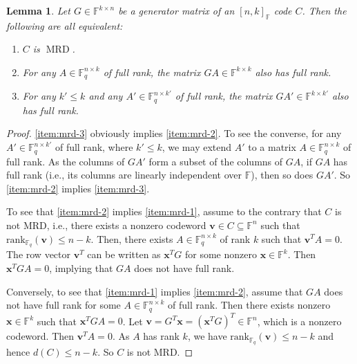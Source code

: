 \documentclass[11pt]{article}
\theoremstyle{plain}
\newtheorem{lemma}[thm]{Lemma}
\theoremstyle{definition}
\newtheorem{defn}[thm]{Definition}
\theoremstyle{remark}
\newcommand{\F}{\mathbb{F}}
\newcommand{\bv}{\bm{v}}
\newcommand{\bx}{\bm{x}}
\newcommand{\rank}{\mathrm{rank}}
\begin{document}

\begin{lemma}\label{eqmrd}
Let $G\in \F^{k\times n}$ be a generator matrix of an $[n,k]_{\F}$ code $C$. Then the following are all equivalent:
\begin{enumerate}
\item\label{item:mrd-1} $C$ is $\operatorname{MRD}$.
\item\label{item:mrd-2} For any  $A\in\F_q^{n\times k}$ of full rank, the matrix $GA\in \F^{k\times k}$ also has full rank.
\item\label{item:mrd-3} For any $k'\leq k$ and any $A'\in\F_q^{n\times k'}$ of full rank, the matrix $GA'\in \F^{k\times k'}$ also has full rank.
\end{enumerate}
\end{lemma}

\begin{proof}
\cref{item:mrd-3} obviously implies \cref{item:mrd-2}. To see the converse, for any $A'\in\F_q^{n\times k'}$ of full rank, where $k'\leq k$, we may extend $A'$ to a matrix $A\in \F_q^{n\times k}$ of full rank. As the columns of $GA'$ form a subset of the columns of $GA$, if $GA$ has full rank (i.e., its columns are linearly independent over $\F$), then so does $GA'$.
So \cref{item:mrd-2} implies \cref{item:mrd-3}.

To see that \cref{item:mrd-2} implies \cref{item:mrd-1},
assume to the contrary that $C$ is not MRD, i.e., there exists a nonzero codeword $\bv\in C\subseteq\F^n$ such that $\rank_{\F_q}(\bv)\leq n-k$. Then, there exists $A\in\F_q^{n\times k}$ of rank $k$ such that $\bv^T A=0$. 
The row vector $\bv^T$ can be written as $\bx^T G$ for some nonzero $\bx\in \F^k$. Then $\bx^T G A=0$, implying that $GA$ does not have full rank.

Conversely, to see that \cref{item:mrd-1} implies \cref{item:mrd-2}, assume that $GA$ does not have full rank for some $A\in\F_q^{n\times k}$ of full rank.
Then there exists nonzero $\bx\in \F^k$ such that $\bx^T GA=0$. Let $\bv=G^T\bx=(\bx^T G)^T\in\F^n$, which is a nonzero codeword. Then $\bv^T A=0$. As $A$ has rank $k$, we have $\rank_{\F_q}(\bv)\leq n-k$ and hence $d(C)\leq n-k$. So $C$ is not MRD.
\end{proof}
\end{document}

